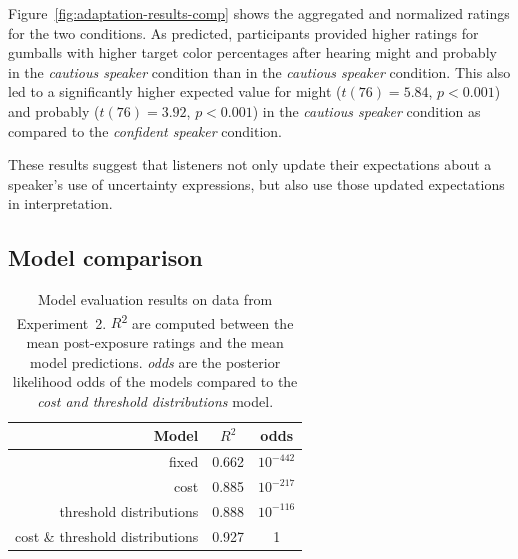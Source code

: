 \documentclass[lucida,biblatex]{sp} %
\begin{document}
Figure~\ref{fig:adaptation-results-comp} shows the aggregated and normalized ratings for the two conditions.  As predicted, participants provided higher ratings for gumballs with higher target color percentages after hearing {\sc might} and {\sc probably} in the \emph{cautious speaker} condition than in the \emph{cautious speaker} condition. This also led to a significantly higher expected value for {\sc might} ($t(76)=5.84$, $p<0.001$) and {\sc probably} ($t(76)=3.92$, $p<0.001$) in the \emph{cautious speaker} condition as compared to the \emph{confident speaker} condition.

These results suggest that listeners not only update their expectations about a speaker's use of uncertainty expressions, but also use those updated expectations in interpretation.

\subsection{Model comparison}

\begin{table}
\center
\begin{tabular}{r | c | c }
Model & $R^2$ &   odds  \\ \midrule
fixed & 0.662 & $10^{-442}$    \\
cost & 0.885 &  $10^{-217}$  \\
threshold distributions & 0.888 & $10^{-116}$  \\
cost \& threshold distributions & 0.927 & 1 \\
\end{tabular}
\caption{Model evaluation results on data from Experiment~2.  $R$\textsuperscript{$2$} are computed between  the mean post-exposure ratings and the mean model predictions. \textit{odds} are the posterior likelihood odds of the models compared to the \textit{cost and threshold distributions} model.  \label{tbl:model-comparison-comp}}
\end{table}
\end{document}
